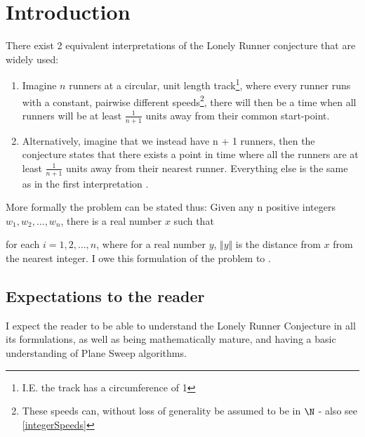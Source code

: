 \section{Introduction}
\label{introduction}

There exist 2 equivalent interpretations of the Lonely Runner conjecture that are widely used:
\begin{enumerate}
\item Imagine $n$ runners at a circular, unit length track\footnote{I.E. the track has a circumference of 1}, where every runner runs with a constant, pairwise different speeds\footnote{These speeds can, without loss of generality be assumed to be in $\N$ \cite{Bienia97flows.view-obstructions} - also see \ref{integerSpeeds}}, there will then be a time when all runners will be at least $\frac{1}{n + 1}$ units away from their common start-point.\\

\item Alternatively, imagine that we instead have n + 1 runners, then the conjecture states that there exists a point in time where all the runners are at least $\frac{1}{n + 1}$ units away from their nearest runner. Everything else is the same as in the first interpretation \cite{Bienia97flows.view-obstructions}.\\
\end{enumerate}

More formally the problem can be stated thus: 
Given any n positive integers $w_1, w_2, \ldots, w_n$, there is a real number $x$ such that 

for each $i = 1, 2, \ldots, n$, where for a real number $y$, $\Vert y \Vert$ is the distance from $x$ from the nearest integer. I owe this formulation of the problem to \cite{ANote}.

\subsection{Expectations to the reader}
\label{expectations}
I expect the reader to be able to understand the Lonely Runner Conjecture in all its formulations, as well as being mathematically mature, and having a basic understanding of Plane Sweep algorithms.


